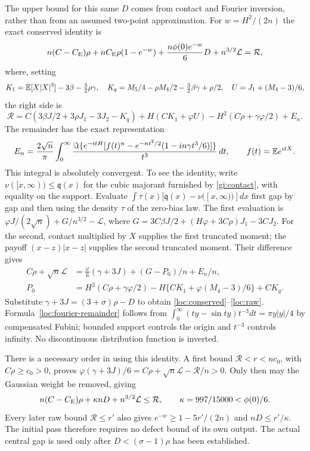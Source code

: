 The upper bound for this same $D$ comes from contact and Fourier
inversion, rather than from an assumed two-point approximation.
For $w=H^2/(2n)$ the exact conserved identity is
\begin{equation}\label{loc:conserved}
 n(C-C_{\mathrm E})\rho+nC_{\mathrm E}\rho(1-e^{-w})
 +\frac{n\phi(0)e^{-w}}6D+n^{3/2}\mathcal L=\mathcal R,
\end{equation}
where, setting
\[
 K_1=\mathbb E[X|X|^3]-3\beta-\tfrac32\rho\gamma,\quad
 K_q=M_5/4-\rho M_4/2-\tfrac32\beta\gamma+\rho/2,
 \quad U=J_1+(M_4-3)/6,
\]
the right side is
\begin{equation}\label{loc:raw}
 \mathcal R=C(3\beta J/2+3\rho J_1-3J_2-K_q)
 +H(CK_1+\varphi U)-H^2(C\rho+\gamma\varphi/2)+E_n.
\end{equation}
The remainder has the exact representation
\begin{equation}\label{loc:fourier-remainder}
 E_n=\frac{2\sqrt n}{\pi}\int_0^\infty
 \frac{\Im\{e^{-itH}[f(t)^n-e^{-nt^2/2}(1-in\gamma t^3/6)]\}}
 {t^3}\,dt,\qquad f(t)=\mathbb E e^{itX}.
\end{equation}
This integral is absolutely convergent.
To see the identity, write $\nu([x,\infty))\le\mathfrak q(x)$ for
the cubic majorant furnished by \eqref{gi:contact}, with equality on
the support. Evaluate
$\int\tau(x)[\mathfrak q(x)-\nu([x,\infty))]dx$ first gap by gap
and then using the density $\tau$ of the zero-bias law.
The first evaluation is
$\varphi J/(2\sqrt n)+G/n^{3/2}-\mathcal L$, where
$G=3C\beta J/2+(H\varphi+3C\rho)J_1-3CJ_2$.
For the second, contact multiplied by $X$ supplies the first truncated
moment; the payoff $(x-z)|x-z|$ supplies the second truncated moment.
Their difference gives
\begin{align*}
 C\rho+\sqrt n\mathcal L
 &=\frac{\varphi}{6}(\gamma+3J)+(G-P_0)/n+E_n/n,\\
 P_0&=H^2(C\rho+\gamma\varphi/2)
      -H\{CK_1+\varphi(M_4-3)/6\}+CK_q.
\end{align*}
Substitute $\gamma+3J=(3+\sigma)\rho-D$ to obtain
\eqref{loc:conserved}--\eqref{loc:raw}.
Formula~\eqref{loc:fourier-remainder} follows from
$\int_0^\infty(ty-\sin ty)t^{-3}dt=\pi y|y|/4$ by compensated
Fubini; bounded support controls the origin and $t^{-3}$ controls
infinity. No discontinuous distribution function is inverted.

There is a necessary order in using this identity. A first bound
$\mathcal R<r<n c_0$, with $C\rho\ge c_0>0$, proves
$\varphi(\gamma+3J)/6=C\rho+\sqrt n\mathcal L-\mathcal R/n>0$.
Only then may the Gaussian weight be removed, giving
\begin{equation}\label{loc:unweighted}
 n(C-C_{\mathrm E})\rho+\kappa nD+n^{3/2}\mathcal L\le\mathcal R,
 \qquad \kappa=997/15000<\phi(0)/6.
\end{equation}
Every later raw bound $\mathcal R\le r'$ also gives
$e^{-w}\ge1-5r'/(2n)$ and $nD\le r'/\kappa$.
The initial pass therefore requires no defect bound of its own output.
The actual central gap is used only after
$D<(\sigma-1)\rho$ has been established.

